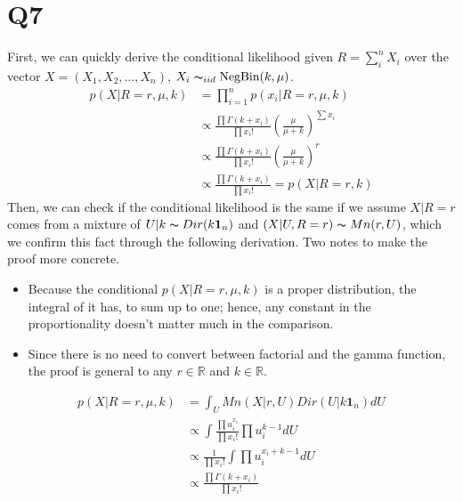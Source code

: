 \documentclass[11pt, letterpaper]{article}
\begin{document}
\section{Q7}
First, we can quickly derive the conditional likelihood given $R=\sum_i^n X_i$ over the vector $X = (X_1, X_2, \dots, X_n)$, $X_i \thicksim_{iid} \text{NegBin}(k, \mu)$.
\begin{align*}
    p(X|R=r, \mu, k) &= \prod_{i=1}^n p(x_i|R=r, \mu, k) \\
        &\propto \frac{\prod \Gamma(k+x_i)}{\prod x_i!} (\frac{\mu}{\mu+k})^{\sum x_i} \\
        &\propto \frac{\prod \Gamma(k+x_i)}{\prod x_i!} (\frac{\mu}{\mu+k})^r \\
        &\propto \frac{\prod \Gamma(k+x_i)}{\prod x_i!} = p(X|R=r, k)
\end{align*}
Then, we can check if the conditional likelihood is the same if we assume $X|R=r$ comes from a mixture of $U|k \thicksim Dir(k\mathbf{1}_n)$ and $(X|U, R=r) \thicksim Mn(r, U)$, which we confirm this fact through the following derivation. Two notes to make the proof more concrete.
\begin{itemize}
    \item Because the conditional $p(X|R=r, \mu, k)$ is a proper distribution, the integral of it has, to sum up to one; hence, any constant in the proportionality doesn't matter much in the comparison.
    \item Since there is no need to convert between factorial and the gamma function, the proof is general to any $r \in \mathbb{R}$ and $k \in \mathbb{R}$.
\end{itemize}
\begin{align*}
    p(X|R=r, \mu, k) &= \int_U Mn(X|r, U) Dir(U|k\mathbf{1}_n) dU \\
        &\propto \int \frac{\prod u_i^{x_i}}{\prod x_i!} \prod u_i^{k-1} dU \\
        &\propto \frac{1}{\prod x_i!} \int \prod u_i^{x_i + k -1} dU \\
        &\propto \frac{\prod \Gamma(k + x_i)}{\prod x_i!}
\end{align*}
\end{document}
